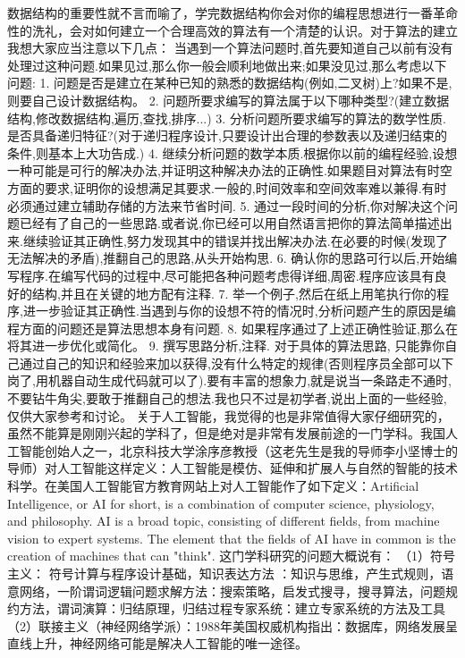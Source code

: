 数据结构的重要性就不言而喻了，学完数据结构你会对你的编程思想进行一番革命性的洗礼，会对如何建立一个合理高效的算法有一个清楚的认识。对于算法的建立我想大家应当注意以下几点：
当遇到一个算法问题时,首先要知道自己以前有没有处理过这种问题.如果见过,那么你一般会顺利地做出来;如果没见过,那么考虑以下问题:
1. 问题是否是建立在某种已知的熟悉的数据结构(例如,二叉树)上?如果不是,则要自己设计数据结构。
2. 问题所要求编写的算法属于以下哪种类型?(建立数据结构,修改数据结构,遍历,查找,排序...)
3. 分析问题所要求编写的算法的数学性质.是否具备递归特征?(对于递归程序设计,只要设计出合理的参数表以及递归结束的条件,则基本上大功告成.)
4. 继续分析问题的数学本质.根据你以前的编程经验,设想一种可能是可行的解决办法,并证明这种解决办法的正确性.如果题目对算法有时空方面的要求,证明你的设想满足其要求.一般的,时间效率和空间效率难以兼得.有时必须通过建立辅助存储的方法来节省时间.
5. 通过一段时间的分析,你对解决这个问题已经有了自己的一些思路.或者说,你已经可以用自然语言把你的算法简单描述出来.继续验证其正确性,努力发现其中的错误并找出解决办法.在必要的时候(发现了无法解决的矛盾),推翻自己的思路,从头开始构思.
6. 确认你的思路可行以后,开始编写程序.在编写代码的过程中,尽可能把各种问题考虑得详细,周密.程序应该具有良好的结构,并且在关键的地方配有注释.
7. 举一个例子,然后在纸上用笔执行你的程序,进一步验证其正确性.当遇到与你的设想不符的情况时,分析问题产生的原因是编程方面的问题还是算法思想本身有问题.
8. 如果程序通过了上述正确性验证,那么在将其进一步优化或简化。
9. 撰写思路分析,注释.
对于具体的算法思路, 只能靠你自己通过自己的知识和经验来加以获得,没有什么特定的规律(否则程序员全部可以下岗了,用机器自动生成代码就可以了).要有丰富的想象力,就是说当一条路走不通时,不要钻牛角尖,要敢于推翻自己的想法.我也只不过是初学者,说出上面的一些经验,仅供大家参考和讨论。
关于人工智能，我觉得的也是非常值得大家仔细研究的，虽然不能算是刚刚兴起的学科了，但是绝对是非常有发展前途的一门学科。我国人工智能创始人之一，北京科技大学涂序彦教授（这老先生是我的导师李小坚博士的导师）对人工智能这样定义：人工智能是模仿、延伸和扩展人与自然的智能的技术科学。在美国人工智能官方教育网站上对人工智能作了如下定义：Artificial Intelligence, or AI for short, is a combination of computer science, physiology, and philosophy. AI is a broad topic, consisting of different fields, from machine vision to expert systems. The element that the fields of AI have in common is the creation of machines that can "think".
这门学科研究的问题大概说有：
（1）符号主义： 符号计算与程序设计基础，知识表达方法 ：知识与思维，产生式规则，语意网络，一阶谓词逻辑问题求解方法：搜索策略，启发式搜寻，搜寻算法，问题规约方法，谓词演算：归结原理，归结过程专家系统：建立专家系统的方法及工具
（2）联接主义（神经网络学派）：1988年美国权威机构指出：数据库，网络发展呈直线上升，神经网络可能是解决人工智能的唯一途径。
